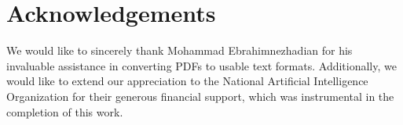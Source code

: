 \section*{Acknowledgements}
We would like to sincerely thank Mohammad Ebrahimnezhadian for his invaluable assistance in converting PDFs to usable text formats. Additionally, we would like to extend our appreciation to the National Artificial Intelligence Organization for their generous financial support, which was instrumental in the completion of this work.